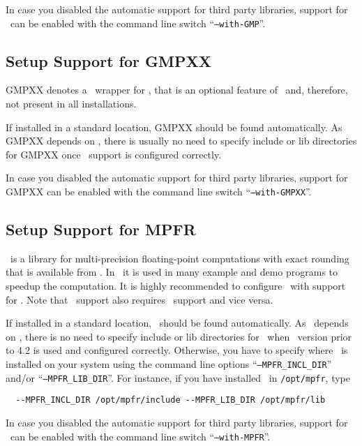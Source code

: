 In case you disabled the automatic support for third party libraries,
support for \gmp\ can be enabled with the command line switch
``\texttt{--with-GMP}''.

\subsection{Setup Support for GMPXX\label{sec:gmpxx-setup}}

GMPXX denotes a \CC\ wrapper for \gmp, that is an optional feature of
\gmp\ and, therefore, not present in all installations.

If installed in a standard location, GMPXX should be found
automatically. As GMPXX depends on \gmp, there is usually no need to
specify include or lib directories for GMPXX once \gmp\ support is
configured correctly.

In case you disabled the automatic support for third party libraries,
support for GMPXX can be enabled with the command line switch
``\texttt{--with-GMPXX}''.

\subsection{Setup Support for MPFR\label{sec:mpfr-setup}}

\mpfr\ is a library for multi-precision floating-point computations
with exact rounding that is available from \mpfrpage. In \cgal\ it is
used in many example and demo programs to speedup the computation. It
is highly recommended to configure \cgal\ with support for \mpfr. Note
that \mpfr\ support also requires \gmp\ support and vice versa.

If installed in a standard location, \mpfr\ should be found
automatically. As \mpfr\ depends on \gmp, there is no need to specify
include or lib directories for \mpfr\ when \gmp\ version prior to 4.2
is used and configured correctly. Otherwise, you have to specify where
\mpfr\ is installed on your system using the command line options
``\texttt{--MPFR\_INCL\_DIR}'' and/or ``\texttt{--MPFR\_LIB\_DIR}''.
For instance, if you have installed \mpfr\ in \texttt{/opt/mpfr}, type
\begin{verbatim}
  --MPFR_INCL_DIR /opt/mpfr/include --MPFR_LIB_DIR /opt/mpfr/lib
\end{verbatim}

In case you disabled the automatic support for third party libraries,
support for \mpfr\ can be enabled with the command line switch
``\texttt{--with-MPFR}''.

